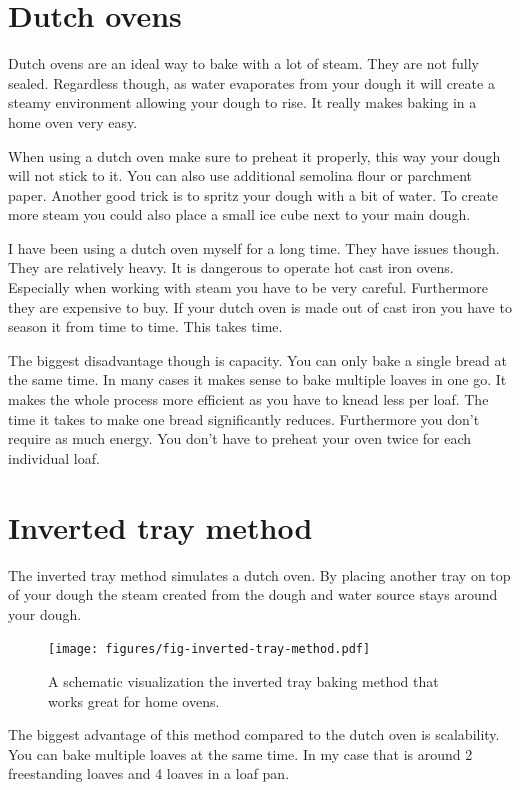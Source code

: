 \section{Dutch ovens}

Dutch ovens are an ideal way to bake with a lot of
steam. They are not fully sealed. Regardless though,
as water evaporates from your dough it will create a steamy
environment allowing your dough to rise. It really
makes baking in a home oven very easy.

When using a dutch oven make sure to preheat it properly,
this way your dough will not stick to it. You can also
use additional semolina flour or parchment paper. Another
good trick is to spritz your dough with a bit of water.
To create more steam you could also place a small ice cube
next to your main dough.

I have been using a dutch oven myself for a long time. They
have issues though. They are relatively heavy. It is dangerous
to operate hot cast iron ovens. Especially when working with steam
you have to be very careful.  Furthermore
they are expensive to buy. If your dutch oven is made out
of cast iron you have to season it from time to time. This takes
time.

The biggest disadvantage though is
capacity. You can only bake a single bread at the
same time. In many cases it makes sense to bake multiple
loaves in one go. It makes the whole process more
efficient as you have to knead less per loaf. The time it
takes to make one bread significantly reduces. Furthermore
you don't require as much energy. You don't have
to preheat your oven twice for each individual loaf.


\section{Inverted tray method}

The inverted tray method simulates a dutch oven.
By placing another tray on top of your dough the steam
created from the dough and water source stays
around your dough.

\begin{figure}[!htb]
  \texttt{[image: figures/fig-inverted-tray-method.pdf]}
  \caption{A schematic visualization the inverted tray baking method that works great for home ovens.}
  \label{fig:inverted-tray-process}
\end{figure}


The biggest advantage of this method compared to the
dutch oven is scalability. You can bake multiple loaves
at the same time. In my case that is around 2 freestanding
loaves and 4 loaves in a loaf pan.

